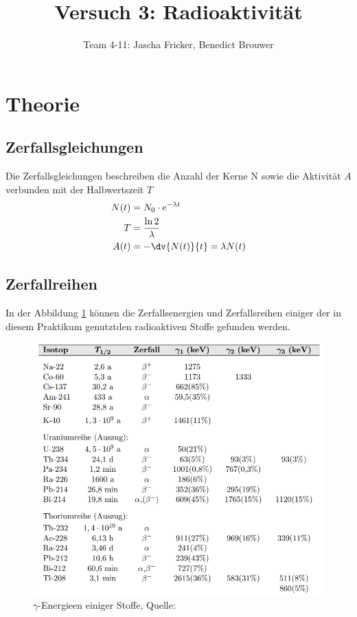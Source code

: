 \documentclass[11pt, a4paper]{article}
\title{Versuch 3: Radioaktivität}
\author{Team 4-11: Jascha Fricker, Benedict Brouwer}
\begin{document}
    \maketitle

    \tableofcontents

    \newpage

    \section{Theorie}
    \FloatBarrier
    \subsection{Zerfallsgleichungen}
    Die Zerfallsgleichungen beschreiben die Anzahl der Kerne N sowie die Aktivität $A$ verbunden mit der Halbwertszeit $T$
    \begin{align}
        N(t) &= N_0 \cdot e^{- \lambda t} \label{eq:zerfälleNachZeit} \\
        T &= \frac{\ln 2}{\lambda} \label{eq:Halbwertszeit}  \\ 
        A(t) &= - \dv{N(t)}{t} = \lambda N(t) \label{eq:Aktivität-halb}
    \end{align}
    
    \subsection{Zerfallreihen}
    In der Abbildung \ref{fig:zerf} können die Zerfallsenergien und Zerfallsreihen einiger der in diesem Praktikum genutztden radioaktiven Stoffe gefunden werden.

    \begin{figure}[!h]
        \centering
        \includegraphics[width=\textwidth]{Screenshot 2023-03-14 5.37.47 PM.png}

        \caption{$\gamma$-Energieen einiger Stoffe, Quelle: \cite{RAD}}
        \label{fig:zerf}
    \end{figure}
    
\end{document}
